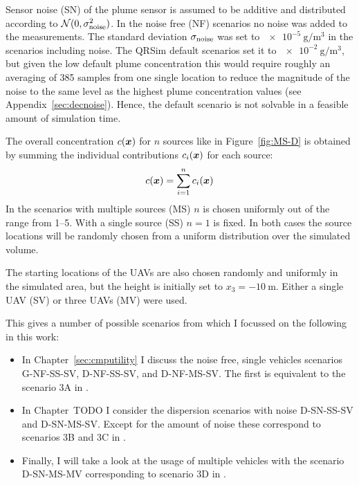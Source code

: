Sensor noise (SN) of the plume sensor is assumed to be additive and distributed 
according to $\mathcal{N}(0, \sigma_{\mathrm{noise}}^2)$. In the noise free (NF) 
scenarios no noise was added to the measurements. The standard deviation 
$\sigma_{\mathrm{noise}}$ was set to $\SI{e-5}{\gram\per\meter\cubed}$ in the 
scenarios including noise.  The QRSim default scenarios set it to 
$\SI{e-2}{\gram\per\meter\cubed}$, but given the low default plume concentration 
this would require roughly an averaging of 385 samples from one single location 
to reduce the magnitude of the noise to the same level as the highest plume 
concentration values (see Appendix~\ref{sec:decnoise}).  Hence, the default 
scenario is not solvable in a feasible amount of simulation time.

The overall concentration $c(\bm{x})$ for $n$ sources like in 
Figure~\ref{fig:MS-D} is obtained by summing the individual contributions 
$c_i(\bm{x})$ for each source:
\begin{equation}
    c(\bm{x}) = \sum_{i = 1}^n c_i(\bm{x})
\end{equation}
In the scenarios with multiple sources (MS) $n$ is chosen uniformly out of the 
range from \numrange{1}{5}. With a single source (SS) $n = 1$ is fixed. In both 
cases the source locations will be randomly chosen from a uniform distribution 
over the simulated volume.

The starting locations of the UAVs are also chosen randomly and uniformly in the 
simulated area, but the height is initially set to $x_3 = \SI{-10}{\meter}$.  
Either a single UAV (SV) or three UAVs (MV) were used.

This gives a number of possible scenarios from which I focussed on the following 
in this work:
\begin{itemize}
    \item In Chapter~\ref{sec:cmputility} I discuss the noise free, single 
        vehicles scenarios G-NF-SS-SV, D-NF-SS-SV, and D-NF-MS-SV\@. The first 
        is equivalent to the scenario 3A in \textcite{denardi2013rn}.
    \item In Chapter~TODO I consider the dispersion scenarios with noise 
        D-SN-SS-SV and D-SN-MS-SV\@. Except for the amount of noise these 
        correspond to scenarios 3B and 3C in \textcite{denardi2013rn}.
    \item Finally, I will take a look at the usage of multiple vehicles with the 
        scenario D-SN-MS-MV corresponding to scenario 3D in 
        \textcite{denardi2013rn}.
\end{itemize}
